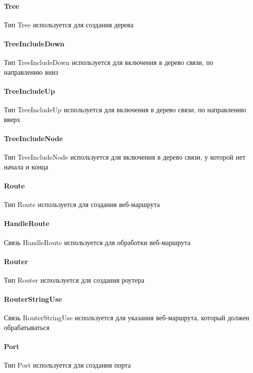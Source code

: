 \documentclass{article}
\begin{document}
\paragraph*{Tree}\hypertarget{Core.Tree.Description}{}
Тип Tree используется для создания дерева
\paragraph*{TreeIncludeDown}\hypertarget{Core.TreeIncludeDown.Description}{}
Тип TreeIncludeDown используется для
включения в дерево связи, по направлению вниз
\paragraph*{TreeIncludeUp}\hypertarget{Core.TreeIncludeUp.Description}{}
Тип TreeIncludeUp используется для включения в
дерево связи, по направлению вверх
\paragraph*{TreeIncludeNode}\hypertarget{Core.TreeIncludeNode.Description}{}
Тип TreeIncludeNode используется для
включения в дерево связи, у которой нет начала и конца
\paragraph*{Route}\hypertarget{Core.Route.Description}{}
Тип Route используется для создания веб-маршрута
\paragraph*{HandleRoute}\hypertarget{Core.HandleRoute.Description}{}
Связь HandleRoute используется для обработки
веб-маршрута

\paragraph*{Router}\hypertarget{Core.Router.Description}{}
Тип Router используется для создания роутера
\paragraph*{RouterStringUse}\hypertarget{Core.RouterStringUse.Description}{}
Связь RouterStringUse используется для
указания веб-маршрута, который должен обрабатываться
\paragraph*{Port}\hypertarget{Core.Port.Description}{}
Тип Port используется для создания порта
\end{document}
